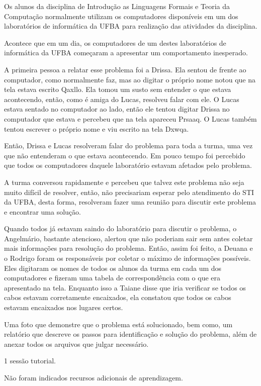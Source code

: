 Os alunos da disciplina de Introdução as Linguagens Formais e Teoria da Computação normalmente
utilizam os computadores disponíveis em um dos laboratórios de informática da UFBA para
realização das atividades da disciplina.

Acontece que em um dia, os computadores de um destes laboratórios
de informática da UFBA começaram a apresentar um comportamento inesperado.

A primeira pessoa a relatar esse problema foi a Drissa.
Ela sentou de frente ao computador, como normalmente faz, mas ao digitar o próprio nome notou
que na tela estava escrito Qaxllo.
Ela tomou um susto sem entender o que estava acontecendo, então, como é amiga do Lucas, resolveu falar
com ele.
O Lucas estava sentado no computador ao lado, então ele tentou digitar Drissa no computador
que estava e percebeu que na tela apareceu Prsaaq.
O Lucas também tentou escrever o próprio nome e viu escrito na tela Dxwqa.

Então, Drissa e Lucas resolveram falar do problema para toda a turma, uma vez que não entenderam o
que estava acontecendo.
Em pouco tempo foi percebido que todos os computadores daquele laboratório estavam afetados
pelo problema.

A turma conversou rapidamente e percebeu que talvez este problema não seja muito difícil de resolver, então,
não precisariam esperar pelo atendimento do STI da UFBA, desta forma, resolveram fazer uma reunião para
discutir este problema e encontrar uma solução.

Quando todos já estavam saindo do laboratório para discutir o problema, o Angelmário, bastante atencioso,
alertou que não poderiam sair sem antes coletar mais informações para resolução do problema.
Então, assim foi feito, a Deuana e o Rodrigo foram os responsáveis por coletar o máximo de informações
possíveis.
Eles digitaram os nomes de todos os alunos da turma em cada um dos computadores e fizeram uma tabela de
correspondência com o que era apresentado na tela.
Enquanto isso a Taiane disse que iria verificar se todos os cabos estavam
corretamente encaixados, ela constatou que todos os cabos estavam encaixados nos lugares certos.

Uma foto que demonstre que o problema está solucionado, bem como, um relatório que descreve os passos
para identificação e solução do problema, além de anexar todos os arquivos que julgar necessário.


1 sessão tutorial.

Não foram indicados recursos adicionais de aprendizagem.
